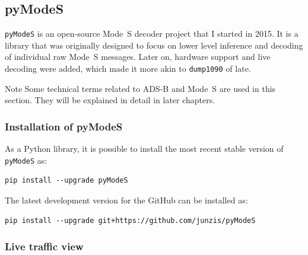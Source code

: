 
  


\subsection{pyModeS}
\texttt{pyModeS} is an open-source Mode~S decoder project that I started in 2015. It is a library that was originally designed to focus on lower level inference and decoding of individual raw Mode~S messages. Later on, hardware support and live decoding were added, which made it more akin to \texttt{dump1090} of late.

\begin{notebox}{Note}
  Some technical terms related to ADS-B and Mode~S are used in this section. They will be explained in detail in later chapters.
\end{notebox}

\subsubsection{Installation of pyModeS}

As a Python library, it is possible to install the most recent stable version of \texttt{pyModeS} as:

\begin{verbatim}
pip install --upgrade pyModeS
\end{verbatim}

The latest development version for the GitHub can be installed as:

\begin{verbatim}
pip install --upgrade git+https://github.com/junzis/pyModeS
\end{verbatim}


\subsubsection{Live traffic view}

